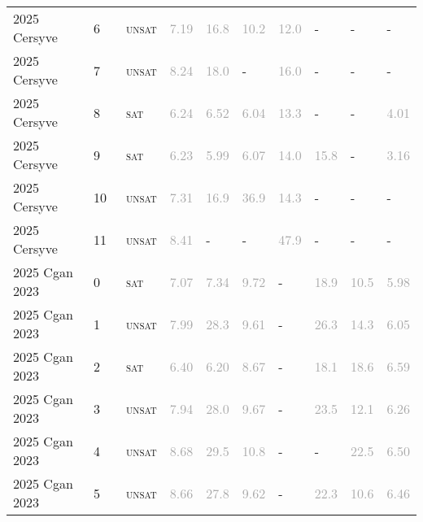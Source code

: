 \begin{center}
{\begin{longtable}{@{}llllllllll@{}}
2025 Cersyve & 6 & ~\textsc{unsat} & \textcolor{darkgray}{7.19} & \textcolor{darkgray}{16.8} & \textcolor{darkgray}{10.2} & \textcolor{darkgray}{12.0} & - & - & - \\
2025 Cersyve & 7 & ~\textsc{unsat} & \textcolor{darkgray}{8.24} & \textcolor{darkgray}{18.0} & - & \textcolor{darkgray}{16.0} & - & - & - \\
2025 Cersyve & 8 & ~\textsc{sat} & \textcolor{darkgray}{6.24} & \textcolor{darkgray}{6.52} & \textcolor{darkgray}{6.04} & \textcolor{darkgray}{13.3} & - & - & \textcolor{darkgray}{4.01} \\
2025 Cersyve & 9 & ~\textsc{sat} & \textcolor{darkgray}{6.23} & \textcolor{darkgray}{5.99} & \textcolor{darkgray}{6.07} & \textcolor{darkgray}{14.0} & \textcolor{darkgray}{15.8} & - & \textcolor{darkgray}{3.16} \\
2025 Cersyve & 10 & ~\textsc{unsat} & \textcolor{darkgray}{7.31} & \textcolor{darkgray}{16.9} & \textcolor{darkgray}{36.9} & \textcolor{darkgray}{14.3} & - & - & - \\
2025 Cersyve & 11 & ~\textsc{unsat} & \textcolor{darkgray}{8.41} & - & - & \textcolor{darkgray}{47.9} & - & - & - \\
\midrule
2025 Cgan 2023 & 0 & ~\textsc{sat} & \textcolor{darkgray}{7.07} & \textcolor{darkgray}{7.34} & \textcolor{darkgray}{9.72} & - & \textcolor{darkgray}{18.9} & \textcolor{darkgray}{10.5} & \textcolor{darkgray}{5.98} \\
2025 Cgan 2023 & 1 & ~\textsc{unsat} & \textcolor{darkgray}{7.99} & \textcolor{darkgray}{28.3} & \textcolor{darkgray}{9.61} & - & \textcolor{darkgray}{26.3} & \textcolor{darkgray}{14.3} & \textcolor{darkgray}{6.05} \\
2025 Cgan 2023 & 2 & ~\textsc{sat} & \textcolor{darkgray}{6.40} & \textcolor{darkgray}{6.20} & \textcolor{darkgray}{8.67} & - & \textcolor{darkgray}{18.1} & \textcolor{darkgray}{18.6} & \textcolor{darkgray}{6.59} \\
2025 Cgan 2023 & 3 & ~\textsc{unsat} & \textcolor{darkgray}{7.94} & \textcolor{darkgray}{28.0} & \textcolor{darkgray}{9.67} & - & \textcolor{darkgray}{23.5} & \textcolor{darkgray}{12.1} & \textcolor{darkgray}{6.26} \\
2025 Cgan 2023 & 4 & ~\textsc{unsat} & \textcolor{darkgray}{8.68} & \textcolor{darkgray}{29.5} & \textcolor{darkgray}{10.8} & - & - & \textcolor{darkgray}{22.5} & \textcolor{darkgray}{6.50} \\
2025 Cgan 2023 & 5 & ~\textsc{unsat} & \textcolor{darkgray}{8.66} & \textcolor{darkgray}{27.8} & \textcolor{darkgray}{9.62} & - & \textcolor{darkgray}{22.3} & \textcolor{darkgray}{10.6} & \textcolor{darkgray}{6.46} \\

\end{longtable}}
\end{center}
